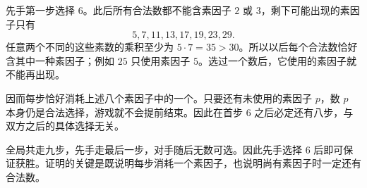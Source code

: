 先手第一步选择 $6$。此后所有合法数都不能含素因子 $2$ 或 $3$，剩下可能出现的素因子只有
\[
 5,7,11,13,17,19,23,29.
\]
任意两个不同的这些素数的乘积至少为 $5\cdot7=35>30$。所以以后每个合法数恰好含其中一种素因子；例如 $25$ 只使用素因子 $5$。选过一个数后，它使用的素因子就不能再出现。

因而每步恰好消耗上述八个素因子中的一个。只要还有未使用的素因子 $p$，数 $p$ 本身仍是合法选择，游戏就不会提前结束。因此在首步 $6$ 之后必定还有八步，与双方之后的具体选择无关。

全局共走九步，先手走最后一步，对手随后无数可选。因此先手选择 $6$ 后即可保证获胜。证明的关键是既说明每步消耗一个素因子，也说明尚有素因子时一定还有合法数。
